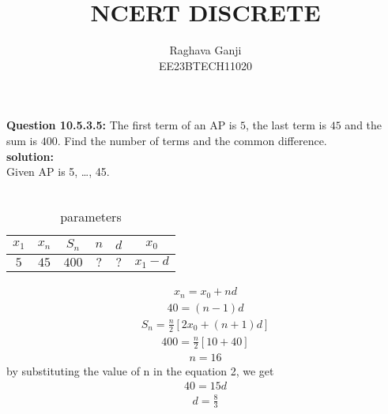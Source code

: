\documentclass[joournal,12pt,twocolumn]{IEEEtran}
\title{NCERT DISCRETE}
\author{Raghava Ganji\\EE23BTECH11020}
\date{}
\begin{document}
\maketitle
\newpage
\bigskip
\textbf{Question 10.5.3.5:}
The first term of an AP is $5$, the last term is $45$ and the sum is $400$. Find the number of terms and the common difference.\\
\textbf{solution:}\\
Given AP is 5, \ldots, 45.\\\\
\begin{table}[H]
\centering
\begin{tabular}{|c|c|c|c|c|c|}\hline
$x_1$ & $x_n$ & $S_n$ & $n$ & $d$ & $x_0$\\ \hline
$5$ & $45$ & $400$ & $?$ & $?$ & $x_1-d$\\ \hline
\end{tabular}
\caption{parameters}
\end{table}
\begin{align}
x_n=x_0+nd
\end{align}
\begin{align}
40=(n-1)d
\end{align}
\begin{align}
S_n=\frac{n}{2} [2x_0+(n+1)d]
\end{align}
\begin{align}
400=\frac{n}{2} [10+40]
\end{align}
\begin{align}
n=16
\end{align}
by substituting the value of n in the equation 2, we get
\begin{align}
40=15d
\end{align}
\begin{align}
d=\frac{8}{3}
\end{align}
\end{document}
